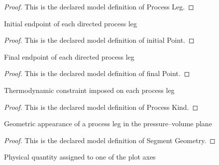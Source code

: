 \begin{proof}
  This is the declared model definition of Process Leg.
\end{proof}
\begin{definition}
  \label{def:physics:phyx-mini-0492:phyxminiproblems-problemphyxmini0492-processleg-initialpoint}
  Initial endpoint of each directed process leg
\end{definition}
\begin{proof}
  This is the declared model definition of initial Point.
\end{proof}
\begin{definition}
  \label{def:physics:phyx-mini-0492:phyxminiproblems-problemphyxmini0492-processleg-finalpoint}
  Final endpoint of each directed process leg
\end{definition}
\begin{proof}
  This is the declared model definition of final Point.
\end{proof}
\begin{definition}
  \label{def:physics:phyx-mini-0492:phyxminiproblems-problemphyxmini0492-processkind}
  Thermodynamic constraint imposed on each process leg
\end{definition}
\begin{proof}
  This is the declared model definition of Process Kind.
\end{proof}
\begin{definition}
  \label{def:physics:phyx-mini-0492:phyxminiproblems-problemphyxmini0492-segmentgeometry}
  Geometric appearance of a process leg in the pressure--volume plane
\end{definition}
\begin{proof}
  This is the declared model definition of Segment Geometry.
\end{proof}
\begin{definition}
  \label{def:physics:phyx-mini-0492:phyxminiproblems-problemphyxmini0492-axisquantity}
  Physical quantity assigned to one of the plot axes
\end{definition}
